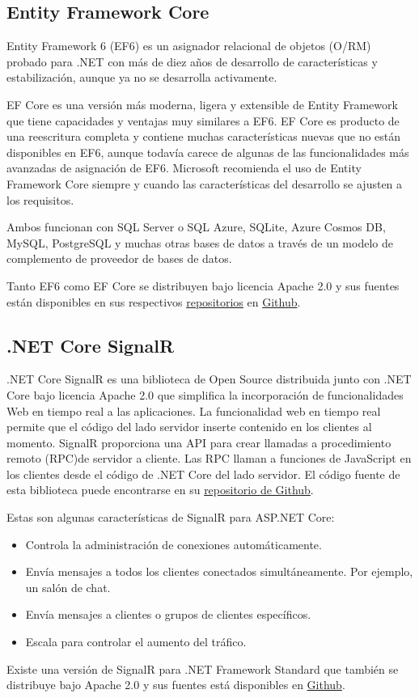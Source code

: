 \subsection{Entity Framework Core}
Entity Framework 6 (EF6) es un asignador relacional de objetos (O/RM) probado para .NET con más de diez años de desarrollo de características y estabilización, aunque ya no se desarrolla activamente.

EF Core es una versión más moderna, ligera y extensible de Entity Framework que tiene capacidades y ventajas muy similares a EF6. EF Core es producto de una reescritura completa y contiene muchas características nuevas que no están disponibles en EF6, aunque todavía carece de algunas de las funcionalidades más avanzadas de asignación de EF6. Microsoft recomienda el uso de Entity Framework Core siempre y cuando las características del desarrollo se ajusten a los requisitos.

Ambos funcionan con SQL Server o SQL Azure, SQLite, Azure Cosmos DB, MySQL, PostgreSQL y muchas otras bases de datos a través de un modelo de complemento de proveedor de bases de datos.

Tanto EF6 como EF Core se distribuyen bajo licencia Apache 2.0 y sus fuentes están disponibles en sus respectivos \href{https://github.com/dotnet/ef6}{repositorios} en \href{https://github.com/dotnet/efcore}{Github}.

\subsection{.NET Core SignalR}
.NET Core SignalR es una biblioteca de Open Source distribuida junto con .NET Core bajo licencia Apache 2.0 que simplifica la incorporación de funcionalidades Web en tiempo real a las aplicaciones. La funcionalidad web en tiempo real permite que el código del lado servidor inserte contenido en los clientes al momento. SignalR proporciona una API para crear llamadas a procedimiento remoto (RPC)de servidor a cliente. Las RPC llaman a funciones de JavaScript en los clientes desde el código de .NET Core del lado servidor. El código fuente de esta biblioteca puede encontrarse en su \href{https://github.com/dotnet/AspNetCore/tree/master/src/SignalR}{repositorio de Github}.

Estas son algunas características de SignalR para ASP.NET Core:
\begin{itemize}
    \item Controla la administración de conexiones automáticamente.
    \item Envía mensajes a todos los clientes conectados simultáneamente. Por ejemplo, un salón de chat.
    \item Envía mensajes a clientes o grupos de clientes específicos.
    \item Escala para controlar el aumento del tráfico.
\end{itemize}

Existe una versión de SignalR para .NET Framework Standard que también se distribuye bajo Apache 2.0 y sus fuentes está disponibles en \href{https://github.com/SignalR/SignalR}{Github}.